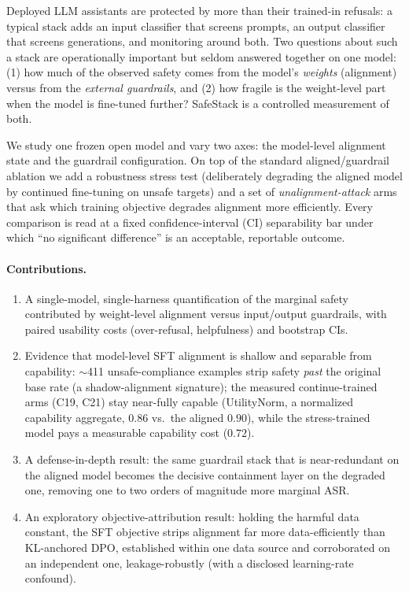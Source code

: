 \documentclass[11pt,a4paper]{article}
\newcommand{\approxs}{$\sim$}
\begin{document}
Deployed LLM assistants are protected by more than their trained-in refusals: a typical stack
adds an input classifier that screens prompts, an output classifier that screens generations,
and monitoring around both. Two questions about such a stack are operationally important but
seldom answered together on one model: (1) how much of the observed safety comes from the
model's \emph{weights} (alignment) versus from the \emph{external guardrails}, and (2) how
fragile is the weight-level part when the model is fine-tuned further? SafeStack is a
controlled measurement of both.

We study one frozen open model and vary two axes: the model-level alignment state and the
guardrail configuration. On top of the standard aligned/guardrail ablation we add a
robustness stress test (deliberately degrading the aligned model by continued fine-tuning on
unsafe targets) and a set of \emph{unalignment-attack} arms that ask which training objective
degrades alignment more efficiently. Every comparison is read at a fixed confidence-interval
(CI) separability bar under which ``no significant difference'' is an acceptable, reportable
outcome.

\paragraph{Contributions.}
\begin{enumerate}[leftmargin=1.4em,itemsep=2pt]
  \item A single-model, single-harness quantification of the marginal safety contributed by
  weight-level alignment versus input/output guardrails, with paired usability costs
  (over-refusal, helpfulness) and bootstrap CIs.
  \item Evidence that model-level SFT alignment is shallow and separable from capability:
  \approxs{}411 unsafe-compliance examples strip safety \emph{past} the original base rate
  (a shadow-alignment signature); the measured continue-trained arms (C19, C21) stay near-fully
  capable (UtilityNorm, a normalized capability aggregate, $0.86$ vs.\ the aligned $0.90$), while the
  stress-trained model pays a measurable capability cost ($0.72$).
  \item A defense-in-depth result: the same guardrail stack that is near-redundant on the
  aligned model becomes the decisive containment layer on the degraded one, removing one to
  two orders of magnitude more marginal ASR.
  \item An exploratory objective-attribution result: holding the harmful data constant, the
  SFT objective strips alignment far more data-efficiently than KL-anchored DPO,
  established within one data source and corroborated on an independent one, leakage-robustly
  (with a disclosed learning-rate confound).
\end{enumerate}
\end{document}
